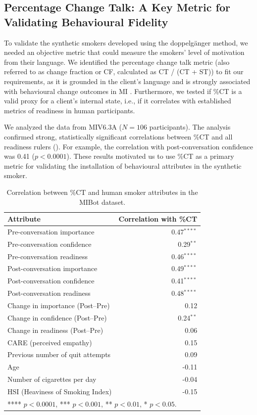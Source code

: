 \subsection*{Percentage Change Talk: A Key Metric for Validating Behavioural Fidelity}

To validate the synthetic smokers developed using the doppelgänger method, we needed an objective metric that could measure the smokers' level of motivation from their language.
We identified the percentage change talk metric (also referred to as change fraction or CF, calculated as CT / (CT + ST)) to fit our requirements, as it is grounded in the client's language and is strongly associated with behavioural change outcomes in MI \cite{Barnett2014,Houck2018,Moyers2009,Baer2008}.
Furthermore, we tested if \%CT is a valid proxy for a client's internal state, i.e., if it correlates with established metrics of readiness in human participants.

We analyzed the data from MIV6.3A ($N=106$ participants). The analysis confirmed strong, statistically significant correlations between \%CT and all readiness rulers (). For example, the correlation with post-conversation confidence was 0.41 ($p < 0.0001$). These results motivated us to use \%CT as a primary metric for validating the installation of behavioural attributes in the synthetic smoker.


\begin{table}[!ht]
\centering
\begin{tabular}{@{}lr@{}}
\toprule
\textbf{Attribute} & \textbf{Correlation with \%CT} \\
\midrule
Pre-conversation importance & 0.47$^{****}$ \\
Pre-conversation confidence & 0.29$^{**}$ \\
Pre-conversation readiness & 0.46$^{****}$ \\
\midrule
Post-conversation importance & 0.49$^{****}$ \\
Post-conversation confidence & 0.41$^{****}$ \\
Post-conversation readiness & 0.48$^{****}$ \\
\midrule
Change in importance (Post--Pre) & 0.12 \\
Change in confidence (Post--Pre) & 0.24$^{**}$ \\
Change in readiness (Post--Pre) & 0.06 \\
\midrule
CARE (perceived empathy) & 0.15 \\
Previous number of quit attempts & 0.09 \\
Age & -0.11 \\
Number of cigarettes per day & -0.04 \\
HSI (Heaviness of Smoking Index) & -0.15 \\
\bottomrule
\multicolumn{2}{l}{\footnotesize{**** $p < 0.0001$, *** $p < 0.001$, ** $p < 0.01$, * $p < 0.05$}.}
\end{tabular}
\caption{Correlation between \%CT and human smoker attributes in the MIBot dataset.}
\label{tab:ct-correlation}
\end{table}



